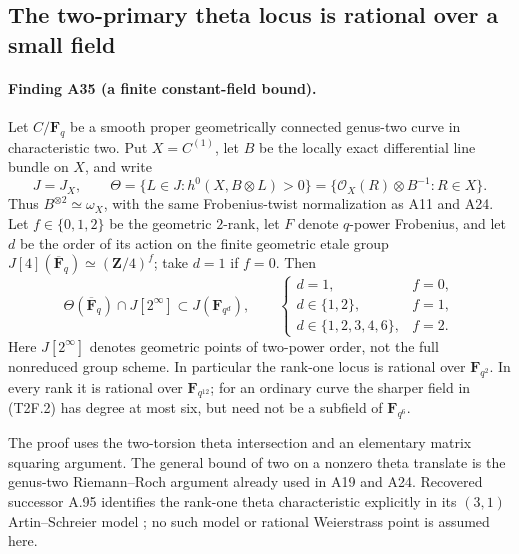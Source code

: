 \subsection{The two-primary theta locus is rational over a small field}
\label{sec:two-primary-theta-field}

\paragraph{Finding A35 (a finite constant-field bound).}
Let $C/\mathbf F_q$ be a smooth proper geometrically connected
genus-two curve in characteristic two. Put $X=C^{(1)}$, let $B$ be
the locally exact differential line bundle on $X$, and write
\[
 J=J_X,\qquad
 \Theta=\{L\in J:h^0(X,B\otimes L)>0\}
       =\{\mathcal O_X(R)\otimes B^{-1}:R\in X\}.
 \tag{T2F.1}
\]
Thus $B^{\otimes2}\simeq\omega_X$, with the same Frobenius-twist
normalization as A11 and A24. Let $f\in\{0,1,2\}$ be the
geometric $2$-rank, let $F$ denote $q$-power Frobenius, and let
$d$ be the order of its action on the finite geometric etale group
$J[4](\overline{\mathbf F}_q)\simeq(\mathbf Z/4)^f$; take $d=1$
if $f=0$. Then
\[
 \Theta(\overline{\mathbf F}_q)\cap J[2^\infty]
              \subset J(\mathbf F_{q^d}),
 \qquad
 \begin{cases}
 d=1,&f=0,\\
 d\in\{1,2\},&f=1,\\
 d\in\{1,2,3,4,6\},&f=2.
 \end{cases}
 \tag{T2F.2}
\]
Here $J[2^\infty]$ denotes geometric points of two-power order,
not the full nonreduced group scheme. In particular the rank-one
locus is rational over $\mathbf F_{q^2}$. In every rank it is
rational over $\mathbf F_{q^{12}}$; for an ordinary curve the
sharper field in (T2F.2) has degree at most six, but need not be a
subfield of $\mathbf F_{q^6}$.

The proof uses the two-torsion theta intersection and an elementary
matrix squaring argument. The general bound of two on a nonzero
theta translate is the genus-two Riemann--Roch argument already
used in A19 and A24. Recovered successor A.95 identifies the
rank-one theta characteristic explicitly in its $(3,1)$
Artin--Schreier model \cite[A.95]{ASrun}; no such model or rational
Weierstrass point is assumed here.

